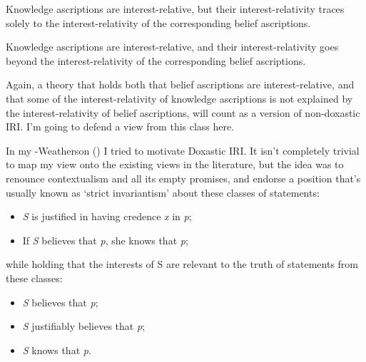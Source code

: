 \documentclass[
  10pt,
  letterpaper,
  DIV=11,
  numbers=noendperiod,
  twoside]{scrartcl}
\providecommand{\tightlist}{%
  \setlength{\itemsep}{0pt}\setlength{\parskip}{0pt}}\usepackage{longtable,booktabs,array}
\begin{document}
\begin{description}
\tightlist
\item[Doxastic IRI]
Knowledge ascriptions are interest-relative, but their
interest-relativity traces solely to the interest-relativity of the
corresponding belief ascriptions.
\item[Non-Doxastic IRI]
Knowledge ascriptions are interest-relative, and their
interest-relativity goes beyond the interest-relativity of the
corresponding belief ascriptions.
\end{description}

Again, a theory that holds both that belief ascriptions are
interest-relative, and that some of the interest-relativity of knowledge
ascriptions is not explained by the interest-relativity of belief
ascriptions, will count as a version of non-doxastic IRI. I'm going to
defend a view from this class here.

In my -Weatherson () I tried
to motivate Doxastic IRI. It isn't completely trivial to map my view
onto the existing views in the literature, but the idea was to renounce
contextualism and all its empty promises, and endorse a position that's
usually known as `strict invariantism' about these classes of
statements:

\begin{itemize}
\tightlist
\item
  \emph{S} is justified in having credence \emph{x} in \emph{p};
\item
  If \emph{S} believes that \emph{p}, she knows that \emph{p};
\end{itemize}

while holding that the interests of S are relevant to the truth of
statements from these classes:

\begin{itemize}
\tightlist
\item
  \emph{S} believes that \emph{p};
\item
  \emph{S} justifiably believes that \emph{p};
\item
  \emph{S} knows that \emph{p}.
\end{itemize}
\end{document}
